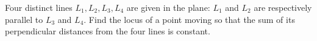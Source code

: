 Four distinct lines $L_1,L_2,L_3,L_4$ are given in the plane: $L_1$ and $L_2$ are respectively parallel to $L_3$ and $L_4$. Find the locus of a point moving so that the sum of its perpendicular distances from the four lines is constant.